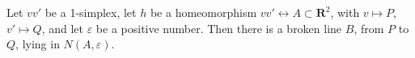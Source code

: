 Let $vv'$ be a 1-simplex, let $h$ be a homeomorphism $vv' \leftrightarrow A \subset \mathbf{R}^2$, with $v \mapsto P$, $v' \mapsto Q$, and let $\varepsilon$ be a positive number. Then there is a broken line $B$, from $P$ to $Q$, lying in $N(A, \varepsilon)$.
